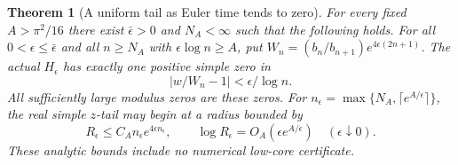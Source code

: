 \documentclass[11pt]{article}
\newtheorem{theorem}{Theorem}
\theoremstyle{remark}\newtheorem{remark}[theorem]{Remark}
\begin{document}
\begin{theorem}[A uniform tail as Euler time tends to zero]
\label{thm:euler-xi-uniform-tail}
For every fixed $A>\pi^2/16$ there exist $\bar\epsilon>0$
and $N_A<\infty$ such that the following holds.
For all $0<\epsilon\le\bar\epsilon$ and all $n\ge N_A$
with $\epsilon\log n\ge A$, put
$W_n=(b_n/b_{n+1})e^{4\epsilon(2n+1)}$.
The actual $H_\epsilon$ has exactly one positive simple zero in
\[
                   |w/W_n-1|<\epsilon/\log n.           \tag{EUT9}
\]
All sufficiently large modulus zeros are these zeros.
For $n_\epsilon=\max\{N_A,\lceil e^{A/\epsilon}\rceil\}$,
the real simple $z$-tail may begin at a radius bounded by
\[
 R_\epsilon\le C_A n_\epsilon e^{4\epsilon n_\epsilon},
 \qquad\log R_\epsilon=O_A(\epsilon e^{A/\epsilon})
                      \quad(\epsilon\downarrow0).       \tag{EUT10}
\]
These analytic bounds include no numerical low-core certificate.
\end{theorem}
\end{document}
